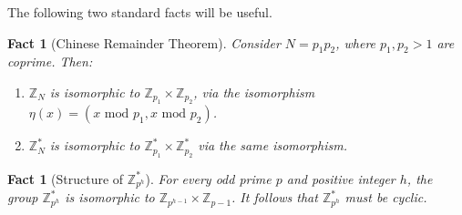 \documentclass[11pt]{article}
\newtheorem{fact}[theorem]{Fact}
\newcommand{\Z}{\mathbb{Z}}
\newcommand{\U}[1]{\mathbb{Z}_{#1}^*}
\renewcommand{\mod}{{\,\,\mathrm{mod}\,\,}}
\begin{document}
The following two standard facts will be useful.
\begin{fact}[Chinese Remainder Theorem]
\label{fact-crt} Consider $N=p_1p_2$, where $p_1,p_2>1$ are
coprime. Then:
\begin{enumerate}
  \item $\Z_N$ is isomorphic to $\Z_{p_1}\times\Z_{p_2}$,
via the isomorphism $\eta(x)=(x\mod p_1,x\mod p_2)$.
  \item $\U{N}$ is isomorphic to $\U{p_1}\times\U{p_2}$ via the same
isomorphism.
\end{enumerate}
\end{fact}

\begin{fact}[Structure of $\U{p^h}$]
\label{fact-zp-cyc} For every odd prime $p$ and positive integer
$h$, the group $\U{p^h}$ is isomorphic to
$\Z_{p^{h-1}}\times\Z_{p-1}$. It follows that $\U{p^h}$ must be
cyclic.
\end{fact}
\end{document}
